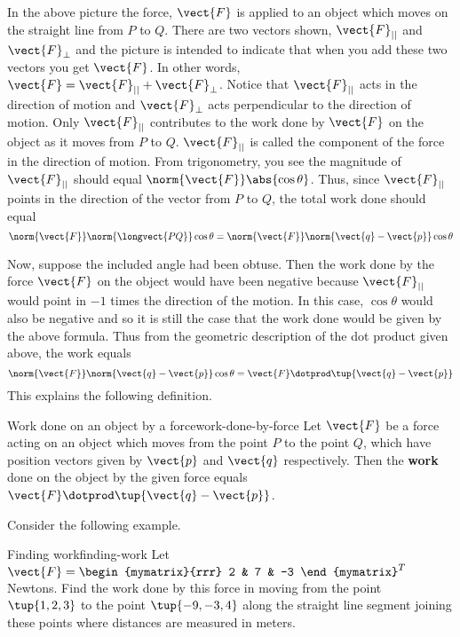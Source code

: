 In the above picture the force, $\vect{F}$ is applied to an object which moves
on the straight line from $P$ to $Q$. There are two vectors shown, $\vect{F}_{||}$ and $\vect{F}_{\bot }$ and the
picture is intended to indicate that when you add these two vectors you get 
$\vect{F}$. In other words, $\vect{F} = \vect{F}_{||} + \vect{F}_{\bot}$. Notice that
 $\vect{F}_{||}$ acts in the direction of motion and 
$\vect{F}_{\bot }$ acts perpendicular to the direction of motion. Only 
$\vect{F}_{||}$ contributes to the work done by $\vect{F}$ on the object
as it moves from $P$ to $Q$. $\vect{F}_{||}$ is
called the component of the force in
 the direction of motion. From trigonometry, you
see the magnitude of $\vect{F}_{||}$ should equal $\norm{\vect{F}
} \abs{\cos \theta}$. Thus, since $\vect{F}_{||}$ points
in the direction of the vector from $P$ to $Q$,
the total work done should equal
\begin{equation*}
\norm{\vect{F}} \norm{
\longvect{PQ}} \cos \theta =\norm{
\vect{F}} \norm{\vect{q}-\vect{p}} \cos \theta
\end{equation*}

Now, suppose the included angle had been obtuse. Then the work done by the force 
$\vect{F}$ on the object would have been negative because $\vect{F}_{||}$
would point in $-1$ times the direction of the motion.  In this case, $\cos \theta $ would also be negative and 
so it is still
the case that the work done would be given by the above formula. Thus from
the geometric description of the dot product given above, the work equals
\begin{equation*}
\norm{\vect{F}} \norm{\vect{q}-\vect{p}} \cos
\theta =\vect{F}\dotprod \tup{\vect{q}-\vect{p}} 
\end{equation*}
This explains the following definition.

\begin{definition}{Work done on an object by a force}{work-done-by-force}
Let $\vect{F}$ be a force acting on an object which moves from the point 
$P$ to the point $Q$, which have position vectors given by $\vect{p}$ and $\vect{q}$ respectively.
 Then the \textbf{work} done
 on the object by the given force equals $\vect{F}\dotprod \tup{
\vect{q}-\vect{p}} $.
\end{definition}

Consider the following example.

\begin{example}{Finding work}{finding-work}
Let $\vect{F}=
\begin{mymatrix}{rrr}
2 & 7 & -3
\end{mymatrix}^T$ Newtons. Find the work
done by this force in moving from the point $\tup{1,2,3} $ to the
point $\tup{-9,-3,4} $ along the straight line segment joining these
points where distances are measured in meters.
\end{example}

